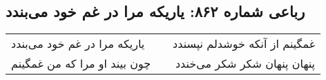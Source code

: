 \begin{center}
\section*{رباعی شماره ۸۶۲: یاریکه مرا در غم خود می‌بندد}
\label{sec:0862}
\begin{longtable}{l p{0.5cm} r}
یاریکه مرا در غم خود می‌بندد
&&
غمگینم از آنکه خوشدلم نپسندد
\\
چون بیند او مرا که من غمگینم
&&
پنهان پنهان شکر شکر می‌خندد
\\
\end{longtable}
\end{center}
